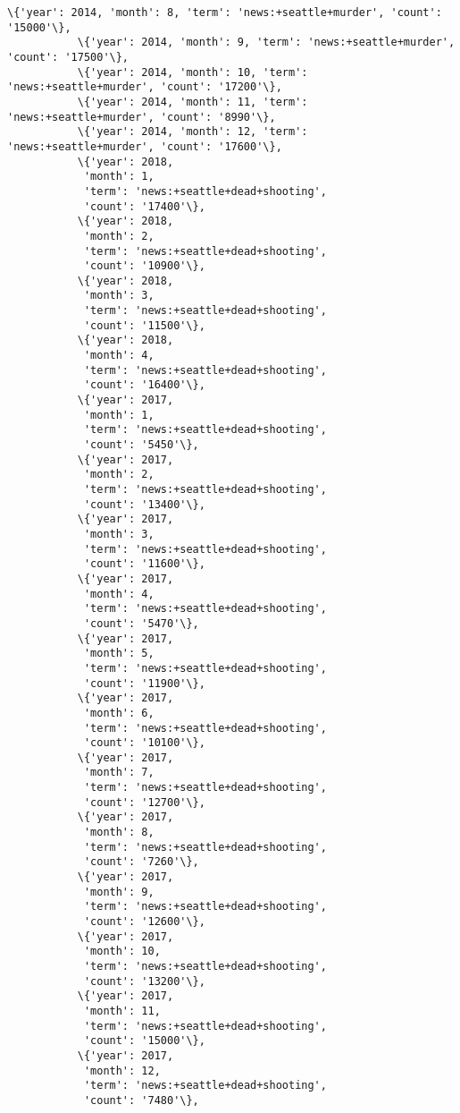 \documentclass[11pt]{article}
\begin{document}
\begin{Verbatim}[commandchars=\\\{\}]
           \{'year': 2014, 'month': 8, 'term': 'news:+seattle+murder', 'count': '15000'\},
           \{'year': 2014, 'month': 9, 'term': 'news:+seattle+murder', 'count': '17500'\},
           \{'year': 2014, 'month': 10, 'term': 'news:+seattle+murder', 'count': '17200'\},
           \{'year': 2014, 'month': 11, 'term': 'news:+seattle+murder', 'count': '8990'\},
           \{'year': 2014, 'month': 12, 'term': 'news:+seattle+murder', 'count': '17600'\},
           \{'year': 2018,
            'month': 1,
            'term': 'news:+seattle+dead+shooting',
            'count': '17400'\},
           \{'year': 2018,
            'month': 2,
            'term': 'news:+seattle+dead+shooting',
            'count': '10900'\},
           \{'year': 2018,
            'month': 3,
            'term': 'news:+seattle+dead+shooting',
            'count': '11500'\},
           \{'year': 2018,
            'month': 4,
            'term': 'news:+seattle+dead+shooting',
            'count': '16400'\},
           \{'year': 2017,
            'month': 1,
            'term': 'news:+seattle+dead+shooting',
            'count': '5450'\},
           \{'year': 2017,
            'month': 2,
            'term': 'news:+seattle+dead+shooting',
            'count': '13400'\},
           \{'year': 2017,
            'month': 3,
            'term': 'news:+seattle+dead+shooting',
            'count': '11600'\},
           \{'year': 2017,
            'month': 4,
            'term': 'news:+seattle+dead+shooting',
            'count': '5470'\},
           \{'year': 2017,
            'month': 5,
            'term': 'news:+seattle+dead+shooting',
            'count': '11900'\},
           \{'year': 2017,
            'month': 6,
            'term': 'news:+seattle+dead+shooting',
            'count': '10100'\},
           \{'year': 2017,
            'month': 7,
            'term': 'news:+seattle+dead+shooting',
            'count': '12700'\},
           \{'year': 2017,
            'month': 8,
            'term': 'news:+seattle+dead+shooting',
            'count': '7260'\},
           \{'year': 2017,
            'month': 9,
            'term': 'news:+seattle+dead+shooting',
            'count': '12600'\},
           \{'year': 2017,
            'month': 10,
            'term': 'news:+seattle+dead+shooting',
            'count': '13200'\},
           \{'year': 2017,
            'month': 11,
            'term': 'news:+seattle+dead+shooting',
            'count': '15000'\},
           \{'year': 2017,
            'month': 12,
            'term': 'news:+seattle+dead+shooting',
            'count': '7480'\},

\end{Verbatim}
\end{document}
